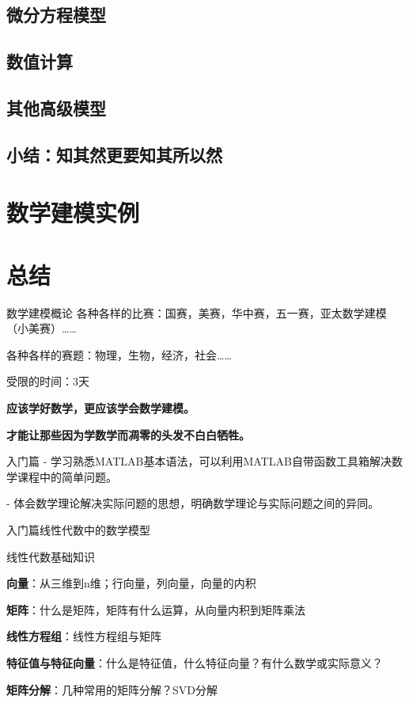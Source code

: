 \documentclass{beamer}
\begin{document}
	\subsection{微分方程模型}
	\subsection{数值计算}
	\subsection{其他高级模型}
	\subsection{小结：知其然更要知其所以然}
\section{数学建模实例}
\section{总结}	
	
\begin{frame}{数学建模概论}
各种各样的比赛：国赛，美赛，华中赛，五一赛，亚太数学建模（小美赛）……

各种各样的赛题：物理，生物，经济，社会……

受限的时间：3天

\textbf{应该学好数学，更应该学会数学建模。}

\textbf{才能让那些因为学数学而凋零的头发不白白牺牲。}

\end{frame}

\begin{frame}{入门篇}
- 学习熟悉MATLAB基本语法，可以利用MATLAB自带函数工具箱解决数学课程中的简单问题。

- 体会数学理论解决实际问题的思想，明确数学理论与实际问题之间的异同。

\end{frame}


\begin{frame}{入门篇}{线性代数中的数学模型}
\begin{block}{线性代数基础知识}

\textbf{向量}：从三维到n维；行向量，列向量，向量的内积

\textbf{矩阵}：什么是矩阵，矩阵有什么运算，从向量内积到矩阵乘法

\textbf{线性方程组}：线性方程组与矩阵

\textbf{特征值与特征向量}：什么是特征值，什么特征向量？有什么数学或实际意义？

\textbf{矩阵分解}：几种常用的矩阵分解？SVD分解
\end{block}
\end{frame}
\end{document}
